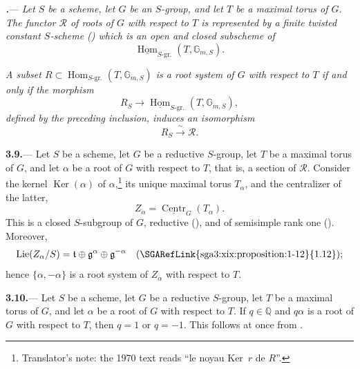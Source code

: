 \par\medskip\noindent
{}\textbf{\textit{.}}---
\textit{Let \(S\) be a scheme, let \(G\) be an \(S\)-group, and let
\(T\) be a maximal torus of \(G\).  The functor \(\mathcal R\) of
roots of \(G\) with respect to \(T\) is represented by a finite
twisted constant \(S\)-scheme \textup{()} which is an
open and closed subscheme of}
\[
  \underline{\operatorname{Hom}}_{S\text{-gr.}}
  (T,\mathbb G_{m,S}).
\]

\textit{A subset
\(R\subset
\operatorname{Hom}_{S\text{-gr.}}(T,\mathbb G_{m,S})\)
is a root system of \(G\) with respect to \(T\) if and only if the
morphism}
\[
  R_S
  \longrightarrow
  \underline{\operatorname{Hom}}_{S\text{-gr.}}
  (T,\mathbb G_{m,S}),
\]
\textit{defined by the preceding inclusion, induces an isomorphism}
\[
  R_S\xrightarrow{\ \sim\ }\mathcal R.
\]

\par\medskip\noindent
\textbf{3.9.}---
Let \(S\) be a scheme, let \(G\) be a reductive \(S\)-group, let \(T\)
be a maximal torus of \(G\), and let \(\alpha\) be a root of \(G\)
with respect to \(T\), that is, a section of \(\mathcal R\).  Consider
the kernel \(\operatorname{Ker}(\alpha)\) of \(\alpha\),\footnote{Translator's note: the 1970 text reads
``le noyau Ker~\(r\) de \(R\)''.} its unique
maximal torus \(T_\alpha\), and the centralizer of the latter,
\[
  Z_\alpha=\underline{\operatorname{Centr}}_G(T_\alpha).
\]
This is a closed \(S\)-subgroup of \(G\), reductive (), and of
semisimple rank one ().  Moreover,
\[
  \operatorname{Lie}(Z_\alpha/S)
  =
  \mathfrak t
  \oplus\mathfrak g^\alpha
  \oplus\mathfrak g^{-\alpha}
  \quad\text{(\SGARefLink{sga3:xix:proposition:1-12}{1.12})};
\]
hence \(\{\alpha,-\alpha\}\) is a root system of \(Z_\alpha\) with
respect to \(T\).

\par\medskip\noindent
\textbf{3.10.}---
Let \(S\) be a scheme, let \(G\) be a reductive \(S\)-group, let \(T\)
be a maximal torus of \(G\), and let \(\alpha\) be a root of \(G\)
with respect to \(T\).  If \(q\in\mathbb Q\) and \(q\alpha\) is a root
of \(G\) with respect to \(T\), then \(q=1\) or \(q=-1\).  This follows
at once from .
